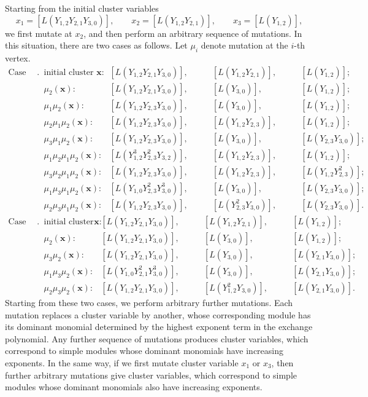 \documentclass[11pt, reqno]{amsart}
\theoremstyle{plain}
\theoremstyle{definition}
\numberwithin{equation}{section}
\begin{document}
Starting from the initial cluster variables
\[
x_1=[L(Y_{1,2}Y_{2,1}Y_{3,0})],\qquad
x_2=[L(Y_{1,2}Y_{2,1})],\qquad
x_3=[L(Y_{1,2})],
\]
we first mutate at $x_2$, and then perform an arbitrary sequence of mutations. In this situation, there are two cases as follows. Let $\mu_i$ denote mutation at the $i$-th vertex.
\begin{align*}
\text{Case (1)}.\quad & \text{initial cluster }\mathbf{x}: &[L(Y_{1,2}Y_{2,1}Y_{3,0})],\qquad &[L(Y_{1,2}Y_{2,1})],\qquad &[L(Y_{1,2})];\qquad\\
&\mu_2(\mathbf{x}):  &[L(Y_{1,2}Y_{2,1}Y_{3,0})], \qquad &[L(Y_{3,0})],\qquad&[L(Y_{1,2})];\qquad \\
&\mu_1\mu_2(\mathbf{x}):  &[L(Y_{1,2}Y_{2,3}Y_{3,0})],\qquad&[L(Y_{3,0})],\qquad&[L(Y_{1,2})];\qquad \\
&\mu_2\mu_1\mu_2(\mathbf{x}) : &[L(Y_{1,2}Y_{2,3}Y_{3,0})],\qquad &[L(Y_{1,2}Y_{2,3})],\qquad&[L(Y_{1,2})];\qquad \\
&\mu_3\mu_1\mu_2(\mathbf{x}): &[L(Y_{1,2}Y_{2,3}Y_{3,0})],\qquad &[L(Y_{3,0})],\qquad &[L(Y_{2,3}Y_{3,0})];\qquad \\
&\mu_1\mu_2\mu_1\mu_2(\mathbf{x}) : &[L(Y^3_{1,2}Y^2_{2,3}Y_{3,2})],\qquad &[L(Y_{1,2}Y_{2,3})],\qquad&[L(Y_{1,2})];\qquad \\
&\mu_3\mu_2\mu_1\mu_2(\mathbf{x}) : &[L(Y_{1,2}Y_{2,3}Y_{3,0})],\qquad &[L(Y_{1,2}Y_{2,3})],\qquad&[L(Y_{1,2}Y^2_{2,3})];\qquad \\
&\mu_1\mu_3\mu_1\mu_2(\mathbf{x}): &[L(Y_{1,0}Y^2_{2,3}Y^3_{3,0})],\qquad &[L(Y_{3,0})],\qquad &[L(Y_{2,3}Y_{3,0})];\qquad \\
&\mu_2\mu_3\mu_1\mu_2(\mathbf{x}): &[L(Y_{1,2}Y_{2,3}Y_{3,0})],\qquad &[L(Y^2_{2,3}Y_{3,0})],\qquad &[L(Y_{2,3}Y_{3,0})].\qquad 
\end{align*}
\begin{align*}
\text{Case (2)}.\quad& \text{initial cluster }\mathbf{x}:&[L(Y_{1,2}Y_{2,1}Y_{3,0})],\qquad & [L(Y_{1,2}Y_{2,1})], & [L(Y_{1,2})];\qquad\\
&\mu_2(\mathbf{x}):  & [L(Y_{1,2}Y_{2,1}Y_{3,0})], \qquad &[L(Y_{3,0})],\qquad &[L(Y_{1,2})];\qquad \\
&\mu_3\mu_2(\mathbf{x}):  & [L(Y_{1,2}Y_{2,1}Y_{3,0})],\qquad &[L(Y_{3,0})], \qquad &
[L(Y_{2,1}Y_{3,0})];\qquad \\
&\mu_1\mu_3\mu_2(\mathbf{x}):  & [L(Y_{1,0}Y^2_{2,1}Y^3_{3,0})],\qquad &[L(Y_{3,0})], \qquad & [L(Y_{2,1}Y_{3,0})];\qquad\\
&\mu_2\mu_3\mu_2(\mathbf{x}):  & [L(Y_{1,2}Y_{2,1}Y_{3,0})],\qquad &[L(Y^2_{1,2}Y_{3,0})], \qquad & [L(Y_{2,1}Y_{3,0})].\qquad
\end{align*}
Starting from these two cases, we perform arbitrary further mutations. Each mutation replaces a cluster variable by another, whose corresponding module has its dominant monomial determined by the highest exponent term in the exchange polynomial. Any further sequence of mutations produces cluster variables, which correspond to simple modules whose dominant monomials have increasing exponents. In the same way, if we first mutate cluster variable $x_1$ or $x_3$, then further arbitrary mutations give cluster variables, which correspond to simple modules whose dominant monomials also have increasing exponents.
\end{document}
